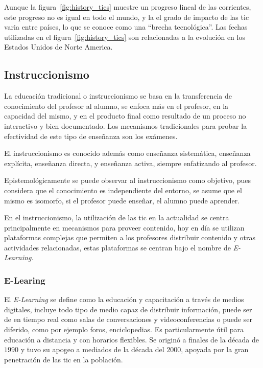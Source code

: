Aunque la figura~\ref{fig:history_tics} muestre un progreso lineal de las
corrientes, este progreso no es igual en todo el mundo, y la el grado de
impacto de las \Gls{tic} varia entre países, lo que se conoce como una
\enquote{brecha tecnológica}. Las fechas utilizadas en el
figura~\ref{fig:history_tics} son relacionadas a la evolución en los Estados
Unidos de Norte America.


\subsection{Instruccionismo}

La educación tradicional o instruccionismo se basa en la transferencia de
conocimiento del profesor al alumno, se enfoca más en el profesor, en la
capacidad del mismo, y en el producto final como resultado de un proceso no
interactivo y bien
documentado\cite{igi:instructionism,johnson2005instructionism}. Los mecanismos
tradicionales para probar la efectividad de este tipo de enseñanza son los
exámenes.

El instruccionismo es conocido además como enseñanza sistemática, enseñanza
explícita, enseñanza directa, y enseñanza activa, siempre enfatizando al
profesor\cite{johnson2005instructionism}.

Epistemológicamente se puede observar al instruccionismo como objetivo, pues
considera que el conocimiento es independiente del entorno, se asume que el
mismo es isomorfo, si el profesor puede enseñar, el alumno puede
aprender\cite{johnson2005instructionism}.

En el instruccionismo, la utilización de las \Gls{tic} en la actualidad se
centra principalmente en mecanismos para proveer contenido, hoy en día se
utilizan plataformas complejas que permiten a los profesores distribuir
contenido y otras actividades relacionadas, estas plataformas se centran bajo
el nombre de \emph{E-Learning}.


\subsubsection{E-Learing} 

El \emph{E-Learning} se define como la educación y capacitación a través de
medios digitales, incluye todo tipo de medio capaz de distribuir información,
puede ser de en tiempo real como salas de conversaciones y videoconferencias o
puede ser diferido, como por ejemplo foros, enciclopedias. Es particularmente
útil para educación a distancia y con horarios flexibles. Se originó a finales
de la década de $1990$ y tuvo su apogeo a mediados de la década del $2000$,
apoyada por la gran penetración de las \Gls{tic} en la
población\cite{punie:ict}.

